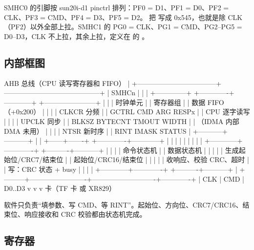 SMHC0 的引脚按 sun20i-d1 pinctrl 排列：PF0 = D1、PF1 = D0、PF2 = CLK、PF3 = CMD、PF4 = D3、PF5 = D2。 把  写成 0x545，也就是除 CLK（PF2）以外全部上拉。SMHC1 的 PG0 = CLK、PG1 = CMD、PG2–PG5 = D0–D3，CLK 不上拉，其余上拉，定义在  的 。

\subsection{内部框图}

\begin{txtcode}
                         AHB 总线（CPU 读写寄存器和 FIFO）
                                    |
+-----------------------------------+------------------------------------------+
| SMHCn                             |                                          |
|  +--------------+   +-------------+------------+   +-----------------------+ |
|  | 时钟单元      |   | 寄存器组                  |   | 数据 FIFO（+0x200）    | |
|  | CLKCR 分频    |   | GCTRL CMD ARG RESPx       |   | CPU 逐字读写           | |
|  | UPCLK 同步    |   | BLKSZ BYTECNT TMOUT WIDTH |   | （IDMA 内部 DMA 未用）  | |
|  | NTSR 新时序   |   | RINT IMASK STATUS         |   +-----------+-----------+ |
|  +------+-------+   +-------------+------------+               |             |
|         |                         |                            |             |
|         |            +------------+-------------+   +----------+-----------+ |
|         |            | 命令状态机                |   | 数据状态机            | |
|         |            | 生成起始位/CRC7/结束位    |   | 起始位/CRC16/结束位   | |
|         |            | 收响应、校验 CRC、超时    |   | 写：CRC 状态 + busy   | |
|         |            +------------+-------------+   +----------+-----------+ |
+---------+-------------------------+----------------------------+-------------+
          | CLK                     | CMD                        | D0..D3
          v                         v                            v
                         卡（TF 卡 或 XR829）
\end{txtcode}

软件只负责“填参数、写 CMD、等 RINT”。起始位、方向位、CRC7/CRC16、结束位、响应接收和 CRC 校验都由状态机完成。

\subsection{寄存器}


